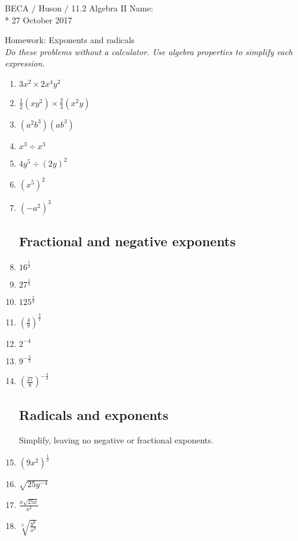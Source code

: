 \documentclass[]{book}
\begin{document}
\noindent BECA / Huson / 11.2 Algebra II \hspace{2in} Name:\\*
27 October 2017
\begin{center}
{\Large Homework: Exponents and radicals}\\
\textit{Do these problems without a calculator. Use algebra properties to simplify each expression.}
\end{center}


\begin{enumerate}

\subsection*{Exponent rules}

\item $3x^2 \times 2x^4y^2$
\item $\displaystyle \frac{1}{2} (xy^2) \times \frac{2}{3}(x^2y)$
\item $(a^2b^3)(ab^3)$
\item $x^3 \div x^3$
\item $4y^5 \div (2y)^2$
\item $(x^5)^2$
\item $(-a^2)^3$

\subsection*{Fractional and negative exponents}

\item $\displaystyle  16^\frac{1}{2}$
\item $\displaystyle  27^\frac{1}{3}$
\item $\displaystyle  125^\frac{2}{3}$
\item $\displaystyle  (\frac{4}{9})^\frac{3}{2}$
\item $2^{-4}$
\item $9^{-\frac{3}{2}}$
\item $(\frac{27}{8})^{-\frac{4}{3}}$

\subsection*{Radicals and exponents}
Simplify, leaving no negative or fractional exponents.

\item $(9x^2)^\frac{1}{2}$
\item $\sqrt{25y^{-4}}$
\item $\displaystyle  \frac{x \sqrt{25x}}{x^{2}}$
\item $\displaystyle  \sqrt[3]{\frac{y^6}{x^{9}}}$





\end{enumerate}
\end{document}
